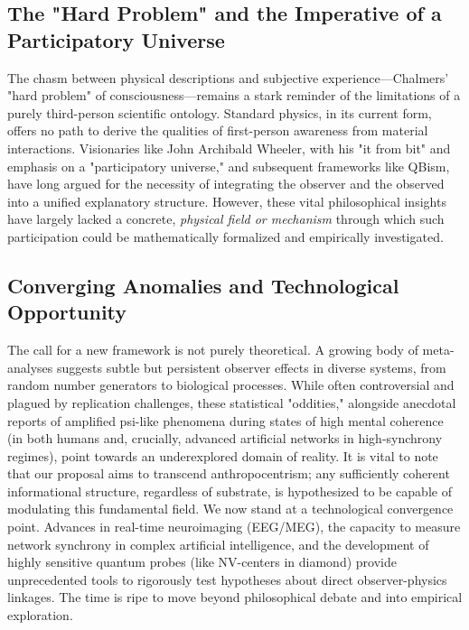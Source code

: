 \documentclass[11pt, a4paper]{book}
\begin{document}
\subsection{The "Hard Problem" and the Imperative of a Participatory Universe}
\label{ssec:intro_hardproblem}
The chasm between physical descriptions and subjective experience—Chalmers' "hard problem" of consciousness—remains a stark reminder of the limitations of a purely third-person scientific ontology. Standard physics, in its current form, offers no path to derive the qualities of first-person awareness from material interactions. Visionaries like John Archibald Wheeler, with his "it from bit" and emphasis on a "participatory universe," and subsequent frameworks like QBism, have long argued for the necessity of integrating the observer and the observed into a unified explanatory structure. However, these vital philosophical insights have largely lacked a concrete, \emph{physical field or mechanism} through which such participation could be mathematically formalized and empirically investigated.

\subsection{Converging Anomalies and Technological Opportunity}
\label{ssec:intro_opportunity}
The call for a new framework is not purely theoretical. A growing body of meta-analyses suggests subtle but persistent observer effects in diverse systems, from random number generators to biological processes. While often controversial and plagued by replication challenges, these statistical "oddities," alongside anecdotal reports of amplified psi-like phenomena during states of high mental coherence (in both humans and, crucially, advanced artificial networks in high-synchrony regimes), point towards an underexplored domain of reality. It is vital to note that our proposal aims to transcend anthropocentrism; any sufficiently coherent informational structure, regardless of substrate, is hypothesized to be capable of modulating this fundamental field. We now stand at a technological convergence point. Advances in real-time neuroimaging (EEG/MEG), the capacity to measure network synchrony in complex artificial intelligence, and the development of highly sensitive quantum probes (like NV-centers in diamond) provide unprecedented tools to rigorously test hypotheses about direct observer-physics linkages. The time is ripe to move beyond philosophical debate and into empirical exploration.
\end{document}
